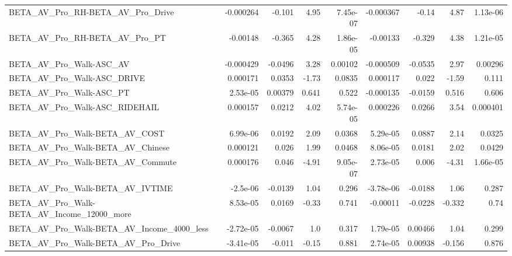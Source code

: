 \begin{tabular}{lrrrrrrrr}
BETA\_AV\_Pro\_RH-BETA\_AV\_Pro\_Drive                   &   -0.000264 &       -0.101 &      4.95 & 7.45e-07 &  -0.000367 &       -0.14 &         4.87 &      1.13e-06 \\
BETA\_AV\_Pro\_RH-BETA\_AV\_Pro\_PT                      &    -0.00148 &       -0.365 &      4.28 & 1.86e-05 &   -0.00133 &      -0.329 &         4.38 &      1.21e-05 \\
BETA\_AV\_Pro\_Walk-ASC\_AV                            &   -0.000429 &      -0.0496 &      3.28 &  0.00102 &  -0.000509 &     -0.0535 &         2.97 &       0.00296 \\
BETA\_AV\_Pro\_Walk-ASC\_DRIVE                         &    0.000171 &       0.0353 &     -1.73 &   0.0835 &   0.000117 &       0.022 &        -1.59 &         0.111 \\
BETA\_AV\_Pro\_Walk-ASC\_PT                            &    2.53e-05 &      0.00379 &     0.641 &    0.522 &  -0.000135 &     -0.0159 &        0.516 &         0.606 \\
BETA\_AV\_Pro\_Walk-ASC\_RIDEHAIL                      &    0.000157 &       0.0212 &      4.02 & 5.74e-05 &   0.000226 &      0.0266 &         3.54 &      0.000401 \\
BETA\_AV\_Pro\_Walk-BETA\_AV\_COST                      &    6.99e-06 &       0.0192 &      2.09 &   0.0368 &   5.29e-05 &      0.0887 &         2.14 &        0.0325 \\
BETA\_AV\_Pro\_Walk-BETA\_AV\_Chinese                   &    0.000121 &        0.026 &      1.99 &   0.0468 &   8.06e-05 &      0.0181 &         2.02 &        0.0429 \\
BETA\_AV\_Pro\_Walk-BETA\_AV\_Commute                   &    0.000176 &        0.046 &     -4.91 & 9.05e-07 &   2.73e-05 &       0.006 &        -4.31 &      1.66e-05 \\
BETA\_AV\_Pro\_Walk-BETA\_AV\_IVTIME                    &    -2.5e-06 &      -0.0139 &      1.04 &    0.296 &  -3.78e-06 &     -0.0188 &         1.06 &         0.287 \\
BETA\_AV\_Pro\_Walk-BETA\_AV\_Income\_12000\_more         &    8.53e-05 &       0.0169 &     -0.33 &    0.741 &   -0.00011 &     -0.0228 &       -0.332 &          0.74 \\
BETA\_AV\_Pro\_Walk-BETA\_AV\_Income\_4000\_less          &   -2.72e-05 &      -0.0067 &       1.0 &    0.317 &   1.79e-05 &     0.00466 &         1.04 &         0.299 \\
BETA\_AV\_Pro\_Walk-BETA\_AV\_Pro\_Drive                 &   -3.41e-05 &       -0.011 &     -0.15 &    0.881 &   2.74e-05 &     0.00938 &       -0.156 &         0.876 \\

\end{tabular}
